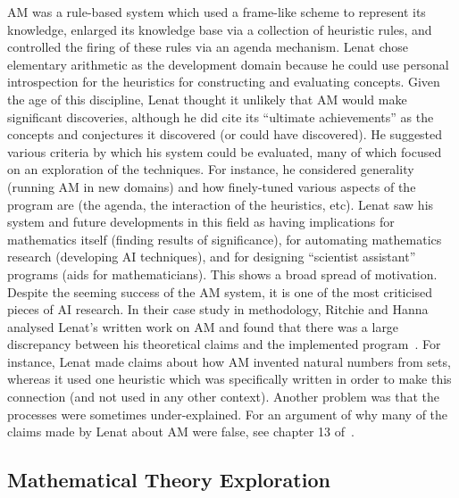AM was a rule-based system which used a frame-like scheme to represent
its knowledge, enlarged its knowledge base via a collection of
heuristic rules, and controlled the firing of these rules via an
agenda mechanism. Lenat chose elementary arithmetic as the development
domain because he could use personal introspection for the heuristics
for constructing and evaluating concepts. Given the age of this
discipline, Lenat thought it unlikely that AM would make significant
discoveries, although he did cite its ``ultimate achievements'' as the
concepts and conjectures it discovered (or could have discovered). He
suggested various criteria by which his system could be evaluated,
many of which focused on an exploration of the techniques. For
instance, he considered generality (running AM in new domains) and how
finely-tuned various aspects of the program are (the agenda, the
interaction of the heuristics, etc). %
Lenat saw his system and future developments in this field as having
implications for mathematics itself (finding results of significance),
for automating mathematics research (developing AI techniques), and
for designing ``scientist assistant'' programs (aids for
mathematicians). This shows a broad spread of motivation. Despite the
seeming success of the AM system, it is one of the most criticised
pieces of AI research. In their case study in methodology, Ritchie and
Hanna analysed Lenat's written work on AM and found that there was a
large discrepancy between his theoretical claims and the implemented
program~\cite{partridge}. For instance, Lenat made claims about how AM
invented natural numbers from sets, whereas it used one heuristic
which was specifically written in order to make this connection (and
not used in any other context). Another problem was that the processes
were sometimes under-explained. For an argument of why many of the
claims made by Lenat about AM were false, see chapter 13 of~\cite{colton:book}.

\subsection{Mathematical Theory Exploration}

